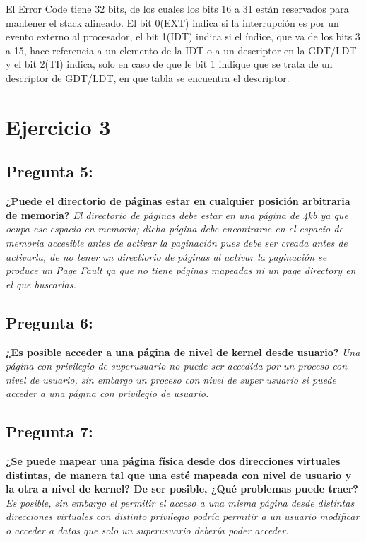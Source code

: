 \documentclass[10pt, a4paper]{article}
\begin{document}
El Error Code tiene 32 bits, de los cuales los bits 16 a 31 están reservados para mantener el stack alineado. El bit 0(EXT) indica si la interrupción es por un evento externo al procesador, el bit 1(IDT) indica si el índice, que va de los bits 3 a 15, hace referencia a un elemento de la IDT o a un descriptor en la GDT/LDT y el bit 2(TI) indica, solo en caso de que le bit 1 indique que se trata de un descriptor de GDT/LDT, en que tabla se encuentra el descriptor.\newline

\section{Ejercicio 3}


{\subsection{Pregunta 5:}} \textbf{¿Puede el directorio de páginas estar en cualquier posición arbitraria de memoria?}\newline
\newline
\textit{
	El directorio de p\'aginas debe estar en una p\'agina de 4kb ya que ocupa ese espacio en memoria; dicha p\'agina debe encontrarse en el espacio de memoria accesible antes de activar la paginaci\'on pues debe ser creada antes de activarla, de no tener un directiorio de p\'aginas al activar la paginaci\'on se produce un Page Fault ya que no tiene p\'aginas mapeadas ni un page directory en el que buscarlas.
}
{\subsection{Pregunta 6:}} \textbf{¿Es posible acceder a una página de nivel de kernel desde usuario?}\newline
\newline
\textit{
	Una p\'agina con privilegio de superusuario no puede ser accedida por un proceso con nivel de usuario, sin embargo un proceso con nivel de super usuario si puede acceder a una p\'agina con privilegio de usuario.
}

{\subsection{Pregunta 7:}} \textbf{¿Se puede mapear una página física desde dos direcciones virtuales
distintas, de manera tal que una esté mapeada con nivel de usuario y la otra a nivel de kernel? De ser posible, ¿Qué problemas puede traer?}\newline
\newline
\textit{
	Es posible, sin embargo el permitir el acceso a una misma p\'agina desde distintas direcciones virtuales con distinto privilegio podr\'ia permitir a un usuario modificar o acceder a datos que solo un superusuario deber\'ia poder acceder.
}
\end{document}
